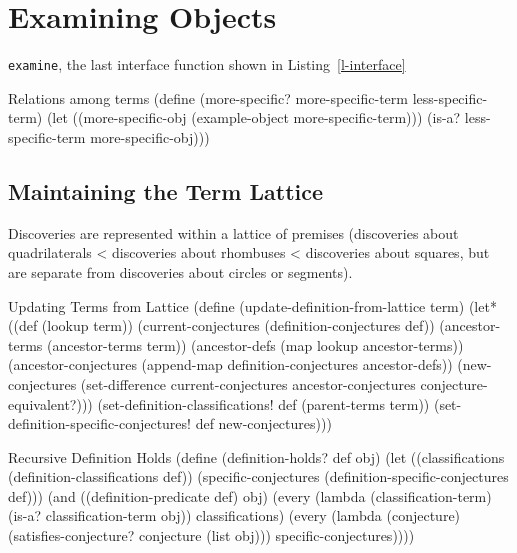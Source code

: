 \section{Examining Objects}

\texttt{examine}, the last interface function shown in
Listing~\ref{l-interface}

\begin{code-listing}
[label=more-specific]
{Relations among terms}
(define (more-specific? more-specific-term less-specific-term)
  (let ((more-specific-obj (example-object more-specific-term)))
    (is-a? less-specific-term more-specific-obj)))
\end{code-listing}


\subsection{Maintaining the Term Lattice}

Discoveries are represented within a lattice of premises (discoveries
about quadrilaterals < discoveries about rhombuses < discoveries about
squares, but are separate from discoveries about circles or segments).

\begin{code-listing}
[label=updating-terms]
{Updating Terms from Lattice}
(define (update-definition-from-lattice term)
  (let* ((def (lookup term))
         (current-conjectures (definition-conjectures def))
         (ancestor-terms (ancestor-terms term))
         (ancestor-defs (map lookup ancestor-terms))
         (ancestor-conjectures
          (append-map definition-conjectures ancestor-defs))
         (new-conjectures
          (set-difference current-conjectures
                          ancestor-conjectures
                          conjecture-equivalent?)))
    (set-definition-classifications! def (parent-terms term))
    (set-definition-specific-conjectures! def new-conjectures)))
\end{code-listing}

\begin{code-listing}
[label=def-holds-2]
{Recursive Definition Holds}
(define (definition-holds? def obj)
  (let ((classifications (definition-classifications def))
        (specific-conjectures (definition-specific-conjectures def)))
    (and ((definition-predicate def) obj)
         (every (lambda (classification-term)
                  (is-a? classification-term obj))
                classifications)
         (every (lambda (conjecture)
                  (satisfies-conjecture? conjecture (list obj)))
                specific-conjectures))))
\end{code-listing}


